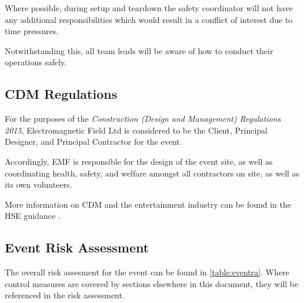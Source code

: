 Where possible, during setup and teardown the safety coordinator will not have
any additional responsibilities which would result in a conflict of interest due
to time pressures.

Notwithstanding this, all team leads will be aware of how to conduct their
operations safely.

\subsection{CDM Regulations}

For the purposes of the \textit{Construction (Design and Management) Regulations 2015},
Electromagnetic Field Ltd is considered to be the Client, Principal Designer,
and Principal Contractor for the event.

Accordingly, EMF is responsible for the design of the event site, as well as
coordinating health, safety, and welfare amongst all contractors on site, as well
as its own volunteers.

More information on CDM and the entertainment industry can be found in the HSE
guidance \cite{cdmguidance}.

\subsection{Event Risk Assessment}
The overall risk assesment for the event can be found in \cref{table:eventra}.
Where control measures are covered by sections elsewhere in this document, they
will be referenced in the risk assessment.


